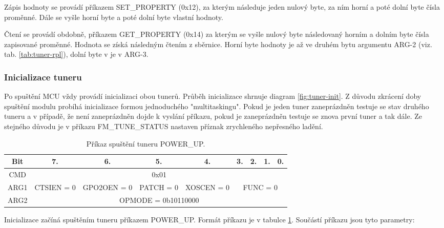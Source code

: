 Zápis hodnoty se provádí příkazem SET\_PROPERTY (0x12), za kterým následuje jeden nulový byte, za ním horní a poté dolní byte čísla proměnné. Dále se vyšle horní byte a poté dolní byte vlastní hodnoty. 

Čtení se provádí obdobně, příkazem GET\_PROPERTY (0x14) za kterým se vyšle nulový byte následovaný horním a dolním byte čísla zapisované proměnné. Hodnota se získá následným čtením z \iic sběrnice. Horní byte hodnoty je až ve druhém bytu argumentu ARG-2 (viz. tab. \ref{tab:tuner-rpl}), dolní byte v je v ARG-3.


\subsubsection{Inicializace tuneru}
\label{subsubsec:tun-init}

Po spuštění MCU vždy provádí inicializaci obou tunerů. Průběh inicializace shrnuje diagram \ref{fig:tuner-init}. Z důvodu zkrácení doby spuštění modulu probíhá inicializace formou jednoduchého "multitaskingu". Pokud je jeden tuner zaneprázdněn testuje se stav druhého tuneru a v případě, že není zaneprázdněn dojde k vyslání příkazu, pokud je zaneprázdněn testuje se znova první  tuner a tak dále. Ze stejného důvodu je v příkazu FM\_TUNE\_STATUS nastaven příznak zrychleného nepřesného ladění.


\begin{table}[ht!]
\begin{center}
\begin{tabular}{|c|c|c|c|c|c|c|c|c|}
\hline 
Bit & 7. & 6. & 5. & 4. & 3. & 2. & 1. & 0. \\ 
\hline 
CMD & \multicolumn{8}{c|}{0x01} \\ 
\hline 
ARG1 & CTSIEN = 0 & GPO2OEN = 0 & PATCH = 0 & XOSCEN = 0 & \multicolumn{4}{c|}{FUNC = 0} \\ 
\hline 
ARG2 & \multicolumn{8}{c|}{OPMODE = 0b10110000} \\ 
\hline 
\end{tabular} 
\end{center}
\caption{Příkaz spuštění tuneru POWER\_UP.}
\label{tab:tuner-power-up} 
\end{table}

Inicializace začíná spuštěním tuneru příkazem POWER\_UP. Formát příkazu je v tabulce \ref{tab:tuner-power-up}. Součástí příkazu jsou tyto parametry:

